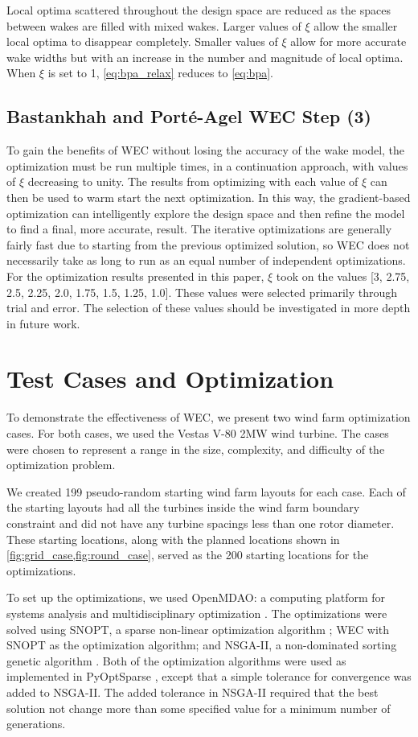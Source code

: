 \documentclass[a4paper]{jpconf}
\begin{document}
Local optima scattered throughout the design space are reduced as the spaces between wakes are filled with mixed wakes. Larger values of $\xi$ allow the smaller local optima to disappear completely. Smaller values of $\xi$ allow for more accurate wake widths but with an increase in the number and magnitude of local optima. When $\xi$ is set to 1, \cref{eq:bpa_relax} reduces to \cref{eq:bpa}.

\subsection{Bastankhah and Port\'e-Agel WEC Step (3)}
To gain the benefits of WEC without losing the accuracy of the wake model, the optimization must be run multiple times, in a continuation approach, with values of $\xi$ decreasing to unity. The results from optimizing with each value of $\xi$ can then be used to warm start the next optimization. In this way, the gradient-based optimization can intelligently explore the design space and then refine the model to find a final, more accurate, result. The iterative optimizations are generally fairly fast due to starting from the previous optimized solution, so WEC does not necessarily take as long to run as an equal number of independent optimizations. For the optimization results presented in this paper, $\xi$ took on the values [3, 2.75, 2.5, 2.25, 2.0, 1.75, 1.5, 1.25, 1.0]. These values were selected primarily through trial and error. The selection of these values should be investigated in more depth in future work.

\section{Test Cases and Optimization}
To demonstrate the effectiveness of WEC, we present two wind farm optimization cases. For both cases, we used the Vestas V-80 2MW wind turbine. The cases were chosen to represent a range in the size, complexity, and difficulty of the optimization problem.

We created 199 pseudo-random starting wind farm layouts for each case. Each of the starting layouts had all the turbines inside the wind farm boundary constraint and did not have any turbine spacings less than one rotor diameter. These starting locations, along with the planned locations shown in \cref{fig:grid_case,fig:round_case}, served as the 200 starting locations for the optimizations.

To set up the optimizations, we used OpenMDAO: a computing platform for systems analysis and multidisciplinary optimization \cite{gray2010_OpenMDAO}. The optimizations were solved using SNOPT, a sparse non-linear optimization algorithm \cite{gill2005}; WEC with SNOPT as the optimization algorithm; 
and NSGA-II, a non-dominated sorting genetic algorithm \cite{deb2002_nsga2}. Both of the optimization algorithms were used as implemented in PyOptSparse \cite{ruben2012_pyopt}, except that a simple tolerance for convergence was added to NSGA-II. The added tolerance in NSGA-II required that the best solution not change more than some specified value for a minimum number of generations. 
\end{document}
